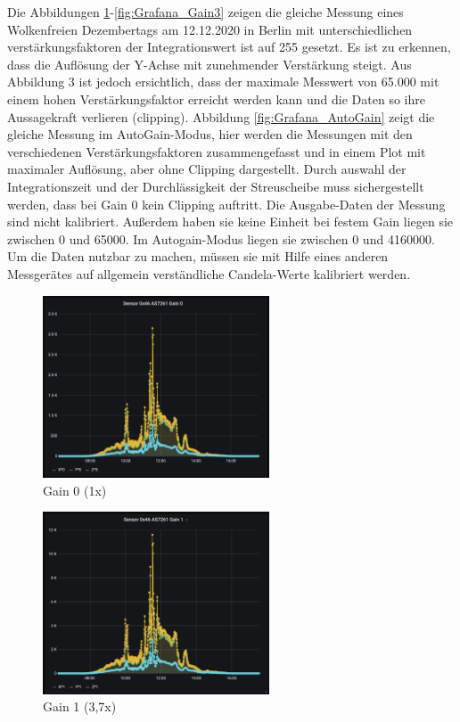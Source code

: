 Die Abbildungen \ref{fig:Grafana_Gain0}-\ref{fig:Grafana_Gain3} zeigen die gleiche Messung eines Wolkenfreien Dezembertags am 12.12.2020 in Berlin mit unterschiedlichen verstärkungsfaktoren der Integrationswert ist auf 255 gesetzt.
Es ist zu erkennen, dass die Auflösung der Y-Achse mit zunehmender Verstärkung steigt. Aus Abbildung 3 ist jedoch ersichtlich, dass der maximale Messwert von 65.000 mit einem hohen Verstärkungsfaktor erreicht werden kann und die Daten so ihre Aussagekraft verlieren (clipping).
Abbildung \ref{fig:Grafana_AutoGain} zeigt die gleiche Messung im AutoGain-Modus, hier werden die Messungen mit den verschiedenen Verstärkungsfaktoren zusammengefasst und in einem Plot mit maximaler Auflösung, aber ohne Clipping dargestellt.
Durch auswahl der Integrationszeit und der Durchlässigkeit der Streuscheibe muss sichergestellt werden, dass bei Gain 0 kein Clipping auftritt.
Die Ausgabe-Daten der Messung sind nicht kalibriert.
Außerdem haben sie keine Einheit bei festem Gain liegen sie zwischen 0 und 65000.
Im Autogain-Modus liegen sie zwischen 0 und 4160000.
Um die Daten nutzbar zu machen, müssen sie mit Hilfe eines anderen Messgerätes auf allgemein verständliche Candela-Werte kalibriert werden.

\begin{figure}[H]
\centering
\includegraphics[width=0.6\textwidth]{img/Grafana-Gain0}
\caption{Gain 0 (1x)}
\label{fig:Grafana_Gain0}
\end{figure}

\begin{figure}[H]
\centering
\includegraphics[width=0.6\textwidth]{img/Grafana-Gain1}
\caption{Gain 1 (3,7x)}
\label{fig:Grafana_Gain1}
\end{figure}

